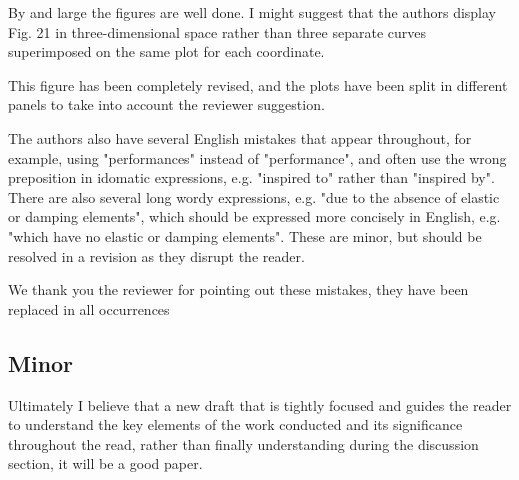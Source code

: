 \begin{point}
	
	By and large the figures are well done. I might suggest that the
	authors display Fig. 21 in three-dimensional space rather than three
	separate curves superimposed on the same plot for each coordinate. 
	
\end{point}
\begin{reply}
This figure has been completely revised, and the plots have been split in different panels to take into account the reviewer suggestion.
\end{reply}


\begin{point}
	
	
	The authors also have several English mistakes that appear throughout,
	for example, using "performances" instead of "performance", and often
	use the wrong preposition in idomatic expressions, e.g. "inspired to"
	rather than "inspired by". There are also several long wordy
	expressions, e.g. "due to the absence of elastic or damping elements",
	which should be expressed more concisely in English, e.g. "which have
	no elastic or damping elements". These are minor, but should be
	resolved in a revision as they disrupt the reader.
\end{point}
\begin{reply}
We thank you the reviewer for pointing out these mistakes, they have been replaced in all occurrences
\end{reply}





\subsection*{Minor}


\begin{point}






Ultimately I believe that a new draft that is tightly focused and
guides the reader to understand the key elements of the work conducted
and its significance throughout the read, rather than finally
understanding during the discussion section, it will be a good paper. \end{point}


